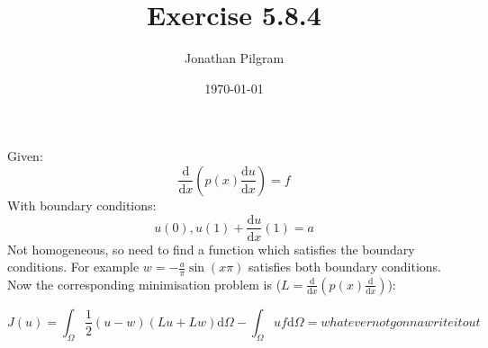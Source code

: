 \documentclass{article}
\title{Exercise 5.8.4}
\author{Jonathan Pilgram}
\date{\today}
\begin{document}
\maketitle
Given:
\[
	\frac{\mathrm{d}}{\mathrm{d}x} (p(x)\frac{\mathrm{d}u}{\mathrm{d}x})=f 
\] 
With boundary conditions: 
\[
	u(0), u(1)+\frac{\mathrm{d}u}{\mathrm{d}x} (1) = a
\] 
Not homogeneous, so need to find a function which satisfies the boundary conditions. For example $w = -\frac{a}{\pi} \sin (x\pi)$ satisfies both boundary conditions. Now the corresponding minimisation problem is ($L=\frac{\mathrm{d}}{\mathrm{d}x} (p(x)\frac{\mathrm{d}}{\mathrm{d}x}) $):

\[
J(u) = \int_{\Omega}^{} \frac{1}{2} (u-w)(Lu+Lw)\mathrm{d}\Omega -  \int_{\Omega}^{}  uf \mathrm{d}\Omega  = whatever not gonna write it out
\] 
\end{document}
